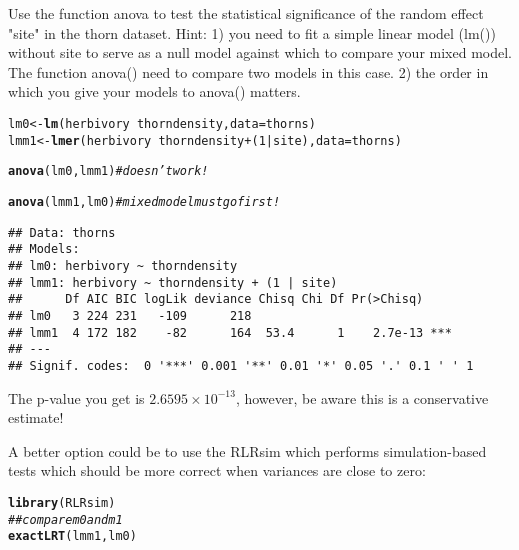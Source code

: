 \documentclass[12pt,a4paper]{scrartcl}\usepackage[]{graphicx}\usepackage[]{color}
\makeatletter
\newcommand{\hlnum}[1]{\textcolor[rgb]{0.686,0.059,0.569}{#1}}%
\newcommand{\hlcom}[1]{\textcolor[rgb]{0.678,0.584,0.686}{\textit{#1}}}%
\newcommand{\hlopt}[1]{\textcolor[rgb]{0,0,0}{#1}}%
\newcommand{\hlstd}[1]{\textcolor[rgb]{0.345,0.345,0.345}{#1}}%
\newcommand{\hlkwb}[1]{\textcolor[rgb]{0.69,0.353,0.396}{#1}}%
\newcommand{\hlkwc}[1]{\textcolor[rgb]{0.333,0.667,0.333}{#1}}%
\newcommand{\hlkwd}[1]{\textcolor[rgb]{0.737,0.353,0.396}{\textbf{#1}}}%
\newenvironment{kframe}{%
 \def\at@end@of@kframe{}%
 \ifinner\ifhmode%
  \def\at@end@of@kframe{\end{minipage}}%
  \begin{minipage}{\columnwidth}%
 \fi\fi%
 \def\FrameCommand##1{\hskip\@totalleftmargin \hskip-\fboxsep
 \colorbox{shadecolor}{##1}\hskip-\fboxsep
     \hskip-\linewidth \hskip-\@totalleftmargin \hskip\columnwidth}%
 \MakeFramed {\advance\hsize-\width
   \@totalleftmargin\z@ \linewidth\hsize
   \@setminipage}}%
 {\par\unskip\endMakeFramed%
 \at@end@of@kframe}
\newenvironment{knitrout}{}{} %
\makeatother
\begin{document}
\begin{Exercise}[difficulty=1, title={Testing variance components in lme4}]
Use the function anova to test the statistical significance of the random effect "site" in the thorn dataset. Hint: 1) you need to fit a simple linear model (lm()) without site to serve as a null model against which to compare your mixed model. The function anova() need to compare two models in this case. 2) the order in which you give your models to anova() matters.
\end{Exercise}
\begin{Answer}
\begin{knitrout}
\color{fgcolor}\begin{kframe}
\begin{alltt}
\hlstd{lm0} \hlkwb{<-} \hlkwd{lm}\hlstd{(herbivory} \hlopt{~} \hlstd{thorndensity ,} \hlkwc{data}\hlstd{=thorns)}
\hlstd{lmm1} \hlkwb{<-} \hlkwd{lmer}\hlstd{(herbivory} \hlopt{~} \hlstd{thorndensity} \hlopt{+} \hlstd{(}\hlnum{1}\hlopt{|}\hlstd{site),} \hlkwc{data}\hlstd{=thorns)}

\hlkwd{anova}\hlstd{(lm0, lmm1)}\hlcom{#doesn't work!}
\end{alltt}


{\ttfamily\noindent\bfseries\color{errorcolor}{\#\# Error: \$ operator not defined for this S4 class}}\begin{alltt}
\hlkwd{anova}\hlstd{(lmm1, lm0)}\hlcom{# mixed model must go first!}
\end{alltt}


{\ttfamily\noindent\itshape\color{messagecolor}{\#\# refitting model(s) with ML (instead of REML)}}\begin{verbatim}
## Data: thorns
## Models:
## lm0: herbivory ~ thorndensity
## lmm1: herbivory ~ thorndensity + (1 | site)
##      Df AIC BIC logLik deviance Chisq Chi Df Pr(>Chisq)    
## lm0   3 224 231   -109      218                            
## lmm1  4 172 182    -82      164  53.4      1    2.7e-13 ***
## ---
## Signif. codes:  0 '***' 0.001 '**' 0.01 '*' 0.05 '.' 0.1 ' ' 1
\end{verbatim}
\end{kframe}
\end{knitrout}
The p-value you get is \ensuremath{2.6595\times 10^{-13}}, however, be aware this is a conservative estimate!

A better option could be to use the RLRsim which performs simulation-based tests which should be more correct when variances are close to zero:
\begin{knitrout}
\color{fgcolor}\begin{kframe}
\begin{alltt}
\hlkwd{library}\hlstd{(RLRsim)}
\hlcom{## compare m0 and m1}
\hlkwd{exactLRT}\hlstd{(lmm1, lm0)}
\end{alltt}



\end{kframe}
\end{knitrout}
\end{Answer}
\end{document}
